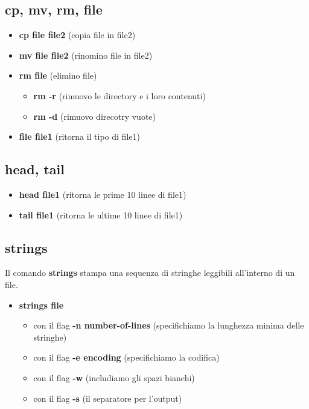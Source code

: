 \documentclass[oneside,a4paper,11pt]{book}
\theoremstyle{italicstyle}
\theoremstyle{normStyle}
\begin{document}
\subsection{cp, mv, rm, file}
\begin{itemize}
    \item \textbf{cp file file2} (copia file in file2)
    \item \textbf{mv file file2} (rinomino file in file2)
    \item \textbf{rm file} (elimino file)
        \begin{itemize}
            \item \textbf{rm -r} (rimuovo le directory e i loro contenuti)
            \item \textbf{rm -d} (rimuovo direcotry vuote)
        \end{itemize}
    \item \textbf{file file1} (ritorna il tipo di file1)
\end{itemize}

\subsection{head, tail}
\begin{itemize}
    \item \textbf{head file1} (ritorna le prime 10 linee di file1)
    \item \textbf{tail file1} (ritorna le ultime 10 linee di file1)
\end{itemize}

\subsection{strings}
Il comando \textbf{strings} stampa una sequenza di stringhe leggibili all'interno di un file.
\begin{itemize}
    \item \textbf{strings file}
    \begin{itemize}
        \item con il flag \textbf{-n number-of-lines} (specifichiamo la lunghezza minima delle stringhe)
        \item con il flag \textbf{-e encoding} (specifichiamo la codifica)
        \item con il flag \textbf{-w} (includiamo gli spazi bianchi)
        \item con il flag \textbf{-s} (il separatore per l'output)
    \end{itemize}
\end{itemize}
\end{document}
